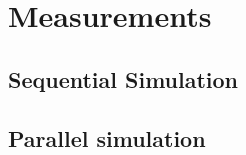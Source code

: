 \chapter{Measurements}
\label{cha:measurements}

\section{Sequential Simulation}
\label{sec:measurements_sequential}

\section{Parallel simulation}
\label{sec:measurements_parallel}